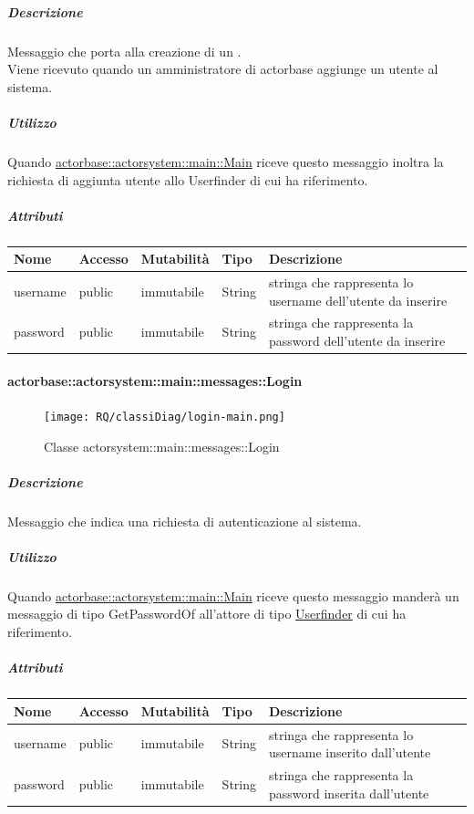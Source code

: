 \documentclass{scalatekids-article}
\begin{document}
\subparagraph{Descrizione}
Messaggio che porta alla creazione di un .\\Viene ricevuto
quando un amministratore di actorbase aggiunge un utente al sistema.

\subparagraph{Utilizzo}
Quando \hyperref[sec:actorbase::actorsystem::main::Main]{actorbase::actorsystem::main::Main}
riceve questo messaggio inoltra la richiesta di aggiunta utente allo
Userfinder di cui ha riferimento.

\subparagraph{Attributi}
\begin{tabular}{| p{3cm} | p{1.5cm} | p{2cm} | p{2cm} | p{8.5cm} |}
  \hline
  Nome & Accesso & Mutabilità & Tipo & Descrizione\\
  \hline
  username & public & immutabile & String & stringa che rappresenta lo username dell'utente da inserire \\
  \hline
  password & public & immutabile & String & stringa che rappresenta la password dell'utente da inserire \\
  \hline
\end{tabular}

\paragraph{actorbase::actorsystem::main::messages::Login}
\label{sec:actorbase::actorsystem::main::messages::Login}

\begin{figure}[H]
   \begin{center}
     \texttt{[image: RQ/classiDiag/login-main.png]}
     \caption{Classe actorsystem::main::messages::Login}
   \end{center}
 \end{figure}

\subparagraph{Descrizione}
Messaggio che indica una richiesta di autenticazione al sistema.

\subparagraph{Utilizzo}
Quando \hyperref[sec:actorbase::actorsystem::main::Main]{actorbase::actorsystem::main::Main}
riceve questo messaggio manderà un messaggio di tipo GetPasswordOf
all'attore di tipo \hyperref[sec:actorbase::actorsystem::userfinder::Userfinder]{Userfinder} di cui ha riferimento.

\subparagraph{Attributi}
\begin{tabular}{| p{3cm} | p{1.5cm} | p{2cm} | p{2cm} | p{8.5cm} |}
  \hline
  Nome & Accesso & Mutabilità & Tipo & Descrizione\\
  \hline
  username & public & immutabile & String & stringa che rappresenta lo username inserito dall'utente \\
  \hline
  password & public & immutabile & String & stringa che rappresenta la password inserita dall'utente \\
  \hline
\end{tabular}
\end{document}
